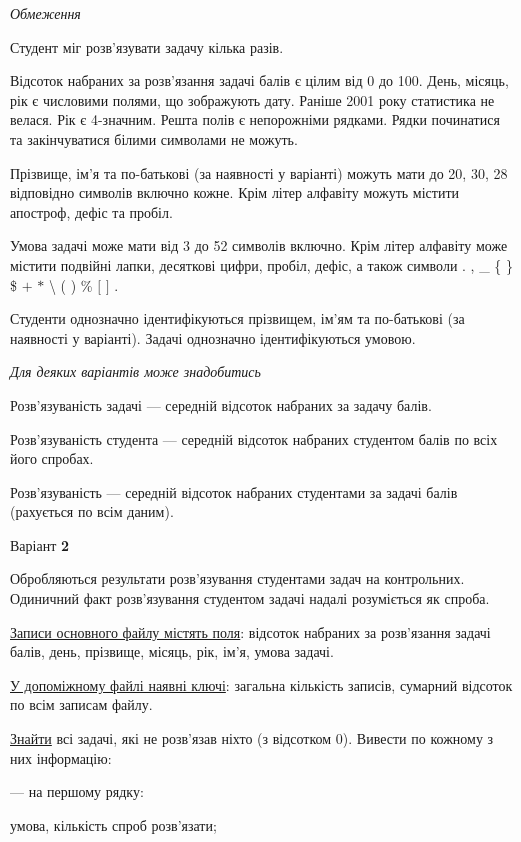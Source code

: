\documentclass[11pt, ukrainian]{article}
\begin{document}

\bigskip\textit{Обмеження}

Студент міг розв’язувати задачу кілька разів.

Відсоток набраних за розв’язання задачі балів є цілим від 0 до 100.
День, місяць, рік є числовими полями, що зображують дату.
Раніше 2001 року статистика не велася. Рік є 4-значним.
Решта полів є непорожніми рядками.
Рядки починатися та закінчуватися білими символами не можуть.

Прізвище, ім’я та по-батькові (за наявності у варіанті) можуть мати до 20, 30, 28 відповідно символів включно кожне. 
Крім літер алфавіту можуть містити апостроф, дефіс та пробіл.

Умова задачі може мати від 3 до 52 символів включно.
Крім літер алфавіту може містити подвійні лапки, десяткові цифри, пробіл, дефіс,
а також символи . , \_ \{ \} \$ $+$ $*$ {\textbackslash} ( ) \% $[$ $]$ .

Студенти однозначно ідентифікуються прізвищем, ім’ям та по-батькові (за наявності у варіанті).
Задачі однозначно ідентифікуються умовою.

\bigskip\textit{Для деяких варіантів може знадобитись}

Розв'язуваність задачі --- середній відсоток набраних за задачу балів.

Розв'язуваність студента --- середній відсоток набраних студентом балів по всіх його спробах.

Розв'язуваність --- середній відсоток набраних студентами за задачі балів (рахується по всім даним).


\par
\newpage
{\center Варіант  \No \textbf { 2 }\par}
\bigskip
Обробляються результати розв’язування студентами задач на контрольних.
Одиничний факт роз\-в’я\-зу\-вання студентом задачі надалі розуміється як спроба.

\underline{Записи основного файлу містять поля}: відсоток набраних за розв’язання задачі балів, день, прізвище, місяць, рік, ім’я, умова задачі.

\underline{У допоміжному файлі наявні ключі}: загальна кількість записів, сумарний відсоток по всім записам файлу.

\underline{Знайти} всі задачі, які не розв’язав ніхто (з відсотком 0). Вивести по кожному з них інформацію:\par
{\noindent}--- на першому рядку:\par
умова, кількість спроб розв’язати;
\end{document}
